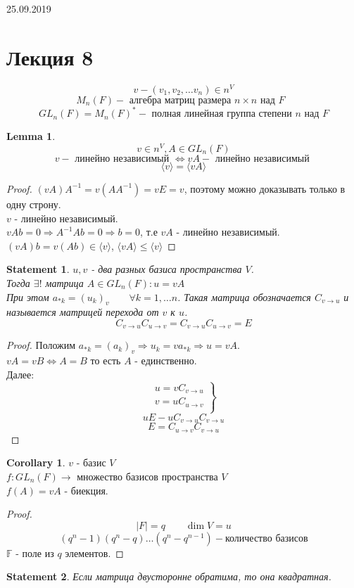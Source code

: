 \documentclass[11pt]{book}
\theoremstyle{definition}
\theoremstyle{plain}
\theoremstyle{plain}
\newtheorem*{lm}{Lemma}
\newtheorem*{st}{Statement}
\theoremstyle{definition}
\newtheorem*{cor}{Corollary}
\theoremstyle{remark}
\begin{document}
25.09.2019
\section{Лекция 8}
$$v - (v_1, v_2 , \ldots v_n) \in n^V$$%
$$M_n(F) - \mbox{ алгебра матриц размера $n \times n$ над $F$ }$$
$$ GL_n(F) = M_n(F)^* - \mbox{ полная линейная группа степени $n$ над $F$}$$

\begin{lm}
    $$ v \in n^V , A \in GL_n(F)$$
    $$ v - \mbox{ линейно независимый } \Leftrightarrow vA - \mbox{ линейно независимый }$$
    $$ \langle v \rangle = \langle vA \rangle $$
\end{lm}
\begin{proof}
    $(vA)A^{-1} = v(AA^{-1}) = vE = v$, поэтому можно доказывать только в одну строну.\\
    $v$ - линейно независимый.\\
    $vAb = 0 \Rightarrow A^{-1} Ab = 0 \Rightarrow b = 0$, т.е $vA$ - линейно независимый. \\
    $(vA)b = v(Ab) \in \langle v \rangle$, $\langle vA \rangle \le \langle v \rangle$
\end{proof}
\begin{st}
    $u, v$ - два разных базиса пространства $V$.\\
    Тогда $\exists ! $ матрица $A \in GL_n(F) : u = vA$\\
    При этом $a_{*k} =(u_k)_v \qquad \forall k = {1, \ldots n}$. Такая матрица обозначается $C_{v\to u}$ и называется матрицей перехода от $v$ к $u$.
    $$ C_{v\to u} C_{u\to v} = C_{v\to u} C_{u\to v} = E$$
\end{st}

\begin{proof}
    Положим $a_{*k} = (a_k)_v \Rightarrow u_k = v a_{*k} \Rightarrow u = vA$. \\
    $vA=vB \Leftrightarrow A = B$ то есть $A$ - единственно.\\
    Далее:\\
    $$ \left. 
	    \begin{array}{rcl}
		u = v C_{v \to u}\\ 
		v = u C_{u \to v}\\
	    \end{array}
	\right \}
	$$
    $$ uE - u C_{v \to u} C_{v \to u} $$
    $$ E = C_{u \to v} C_{v \to u}$$
\end{proof}
\begin{cor}
    $v$ - базис $V$\\
    $f: GL_n(F) \to$ множество базисов пространства $V$\\
    $f(A) = vA$ - биекция.
\end{cor}
\begin{proof}
    $$|F| = q \qquad \dim V = u$$
    $$(q^n -1)(q^n - q) \ldots (q^{n} - q^{n-1}) - \mbox{количество базисов}$$
    $ \mathbb F $ - поле из $q$ элементов.
\end{proof}
\begin{st}
    Если матрица двусторонне обратима, то она квадратная.
\end{st}
\end{document}

